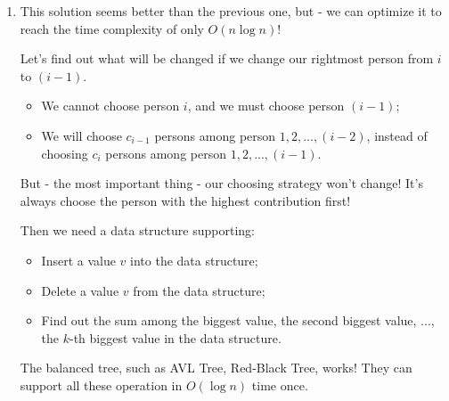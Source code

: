 \documentclass[12pt,a4paper]{article}
\makeatletter
\newtheorem*{solution}{Solution}
\theoremstyle{definition}
\renewenvironment{solution}[1][Solution] {\par\pushQED{\qed}\normalfont\topsep6\p@\@plus6\p@\relax\trivlist\item[\hskip\labelsep\bfseries#1\@addpunct{.}]\ignorespaces}{\popQED\endtrivlist\@endpefalse} \makeatother
\makeatother
\begin{document}
\begin{enumerate}
\begin{solution}
        This solution seems better than the previous one, but - we can optimize it to reach the time complexity of only $O(n\log{n})$!

        Let's find out what will be changed if we change our rightmost person from $i$ to $(i-1)$.
        \begin{itemize}
        \item We cannot choose person $i$, and we must choose person $(i-1)$;
        \item We will choose $c_{i-1}$ persons among person $1, 2, ..., (i-2)$, instead of choosing $c_i$ persons among person $1, 2, ..., (i-1)$.
        \end{itemize}

        But - the most important thing - our choosing strategy won't change! It's always choose the person with the highest contribution first!

        Then we need a data structure supporting:
        \begin{itemize}
        \item Insert a value $v$ into the data structure;
        \item Delete a value $v$ from the data structure;
        \item Find out the sum among the biggest value, the second biggest value, ..., the $k$-th biggest value in the data structure.
        \end{itemize}

        The balanced tree, such as AVL Tree, Red-Black Tree, works! They can support all these operation in $O(\log{n})$ time once.


\end{solution}
\end{enumerate}
\end{document}

